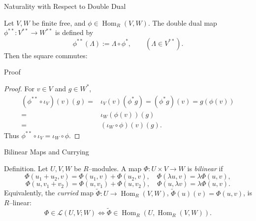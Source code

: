 \begin{frame}{Naturality with Respect to Double Dual}
\vspace{-0.5cm}
\begin{block}{}
Let $V,W$ be finite free, and $\phi\in\operatorname{Hom}_R(V,W)$. The double dual map $\phi^{**}:V^{**}\to W^{**}$ is defined by
\[
\phi^{**}(\Lambda):= \Lambda\circ \phi^*,\qquad (\Lambda\in V^{**}).
\]
Then the square commutes:
\vspace{-0.7cm}
\begin{center}
\end{center}
    
\end{block}
\end{frame}

\begin{frame}{Proof}
    
\begin{proof}
For $v\in V$ and $g\in W^*$,
\begin{align*}
\left(\phi^{**}\circ \iota_V\right)(v)(g)=& \iota_V(v)(\phi^* g) = (\phi^* g)(v)=g(\phi(v))\\
=& \iota_W(\phi(v))(g)\\
=& \left(\iota_W\circ \phi\right)(v)(g).    
\end{align*}
Thus $\phi^{**}\circ \iota_V=\iota_W\circ \phi$.
\end{proof}

\end{frame}

\begin{frame}{Bilinear Maps and Currying}
\begin{block}{Definition.} Let $U,V,W$ be $R$–modules. A map $\Phi:U\times V\to W$ is \emph{bilinear} if
\[
\Phi(u_1+u_2,v)=\Phi(u_1,v)+\Phi(u_2,v),\quad
\Phi(\lambda u,v)=\lambda \Phi(u,v),
\]
\[
\Phi(u,v_1+v_2)=\Phi(u,v_1)+\Phi(u,v_2),\quad
\Phi(u,\lambda v)=\lambda \Phi(u,v).
\]
Equivalently, the \emph{curried} map $\widetilde{\Phi}:U\to \operatorname{Hom}_R(V,W)$, $\widetilde{\Phi}(u)(v)=\Phi(u,v)$, is $R$–linear:
\[
\Phi\in \mathcal{L}(U,V;W) \iff \widetilde{\Phi}\in \operatorname{Hom}_R\left(U,\operatorname{Hom}_R(V,W)\right).
\]
    
\end{block}

\end{frame}


